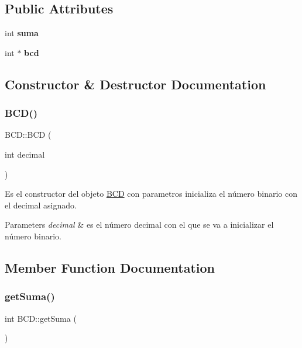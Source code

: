 \subsection*{Public Attributes}
\begin{DoxyCompactItemize}
\item 
\mbox{\label{classBCD_aec89ba159a7db6c1f5542d94f56b257a}} 
int {\bfseries suma}
\item 
\mbox{\label{classBCD_ad8d6bae21dbf8ec970991ef5923b531c}} 
int $\ast$ {\bfseries bcd}
\end{DoxyCompactItemize}


\subsection{Constructor \& Destructor Documentation}
\mbox{\label{classBCD_a83b94116c047169535e9e61aab6d6bb3}} 
\subsubsection{\texorpdfstring{B\+C\+D()}{BCD()}}
{\footnotesize\ttfamily B\+C\+D\+::\+B\+CD (\begin{DoxyParamCaption}\item[{int}]{decimal }\end{DoxyParamCaption})}



Es el constructor del objeto \hyperlink{classBCD}{B\+CD} con parametros inicializa el número binario con el decimal asignado. 


\begin{DoxyParams}{Parameters}
{\em decimal} & es el número decimal con el que se va a inicializar el número binario. \\
\hline
\end{DoxyParams}


\subsection{Member Function Documentation}
\mbox{\label{classBCD_a49603f54ebd9578939224cd5a5a8d96d}} 
\subsubsection{\texorpdfstring{get\+Suma()}{getSuma()}}
{\footnotesize\ttfamily int B\+C\+D\+::get\+Suma (\begin{DoxyParamCaption}{ }\end{DoxyParamCaption})}



